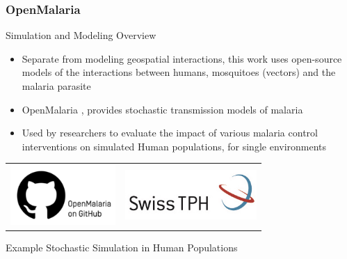 \documentclass[10pt,usenames,dvipsnames]{beamer}
\begin{document}
\subsubsection{OpenMalaria}

\begin{frame}{Simulation and Modeling Overview}


\begin{itemize}
\item Separate from modeling geospatial interactions, this work uses open-source models of the interactions between humans, mosquitoes (vectors) and the malaria parasite
\item OpenMalaria \cite{SMITH2008a}, provides stochastic transmission models of malaria 
\item Used by researchers to evaluate the impact of various malaria control interventions on simulated Human populations, for single environments

\end{itemize}

\centering
 \begin{tabular}{cc}
        
        \includegraphics[width=4cm]{images/GH.png}
        &
         \includegraphics[width=5cm]{images/swiss.jpg}
        
      \end{tabular}

\end{frame}


\begin{frame}{Example Stochastic Simulation in Human Populations}
\hspace{1cm}
 

\cite{Stuckey2012}


\end{frame}
\end{document}
